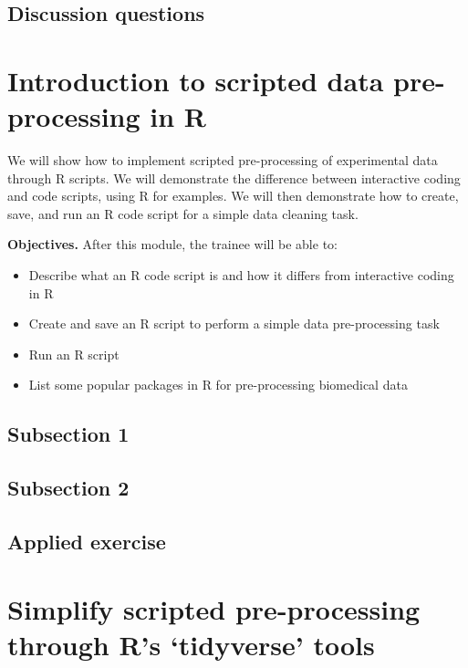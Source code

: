 \documentclass[]{tufte-book}
\providecommand{\tightlist}{%
  \setlength{\itemsep}{0pt}\setlength{\parskip}{0pt}}
\begin{document}
\hypertarget{discussion-questions-5}{%
\subsection{Discussion questions}\label{discussion-questions-5}}

\hypertarget{introduction-to-scripted-data-pre-processing-in-r}{%
\section{Introduction to scripted data pre-processing in R}\label{introduction-to-scripted-data-pre-processing-in-r}}

We will show how to implement scripted pre-processing of experimental data
through R scripts. We will demonstrate the difference between interactive coding
and code scripts, using R for examples. We will then demonstrate how to create,
save, and run an R code script for a simple data cleaning task.

\textbf{Objectives.} After this module, the trainee will be able to:

\begin{itemize}
\tightlist
\item
  Describe what an R code script is and how it differs from interactive
  coding in R
\item
  Create and save an R script to perform a simple data pre-processing task
\item
  Run an R script
\item
  List some popular packages in R for pre-processing biomedical data
\end{itemize}

\hypertarget{subsection-1-4}{%
\subsection{Subsection 1}\label{subsection-1-4}}

\hypertarget{subsection-2-3}{%
\subsection{Subsection 2}\label{subsection-2-3}}

\hypertarget{applied-exercise-4}{%
\subsection{Applied exercise}\label{applied-exercise-4}}

\hypertarget{simplify-scripted-pre-processing-through-rs-tidyverse-tools}{%
\section{Simplify scripted pre-processing through R's `tidyverse' tools}\label{simplify-scripted-pre-processing-through-rs-tidyverse-tools}}
\end{document}
